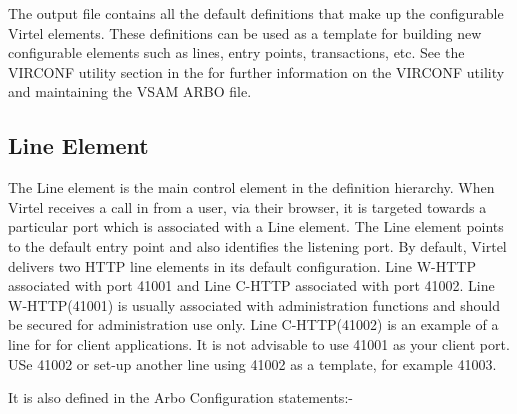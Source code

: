 \documentclass[letterpaper,10pt,english]{sphinxmanual}
\begin{document}

The output file contains all the default definitions that make up the configurable Virtel elements. These definitions can be used as a template for building new configurable elements such as lines, entry points, transactions, etc. See the VIRCONF utility section in the  for further information on the VIRCONF utility and maintaining the VSAM ARBO file.

\newpage


\subsection{Line Element}
\label{\detokenize{connectivity_guide:line-element}}
The Line element is the main control element in the definition hierarchy. When Virtel receives a call in from a user, via their browser, it is targeted towards a particular port which is associated with a Line element.  The Line element points to the default entry point and also identifies the listening port. By default, Virtel delivers two HTTP line elements in its default configuration. Line W-HTTP associated with port 41001 and Line C-HTTP associated with port 41002. Line W-HTTP(41001) is usually associated with administration functions and should be secured for administration use only. Line C-HTTP(41002) is an example of a line for for client applications. It is not advisable to use 41001 as your client port. USe 41002 or set-up another line using 41002 as a template, for example 41003.


It is also defined in the Arbo Configuration statements:-
\end{document}
